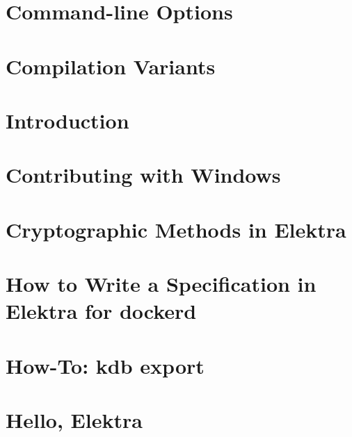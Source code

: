 \let\mypdfximage\pdfximage\def\pdfximage{\immediate\mypdfximage}\documentclass[twoside]{book}
\newcommand{\+}{\discretionary{\mbox{\scriptsize$\hookleftarrow$}}{}{}}
\begin{document}
\chapter{Command-\/line Options}
\label{doc_tutorials_command-line-options_md}

\chapter{Compilation Variants}
\label{doc_tutorials_compilation-variants_md}

\chapter{Introduction}
\label{doc_tutorials_contributing-clion_md}

\chapter{Contributing with Windows}
\label{doc_tutorials_contributing-windows_md}

\chapter{Cryptographic Methods in Elektra}
\label{doc_tutorials_crypto_md}

\chapter{How to Write a Specification in Elektra for dockerd}
\label{doc_tutorials_dockerd-specification_md}

\chapter{How-\/\+To\+: kdb export}
\label{doc_tutorials_export_md}

\chapter{Hello, Elektra}
\label{doc_tutorials_hello-elektra_md}

\end{document}
